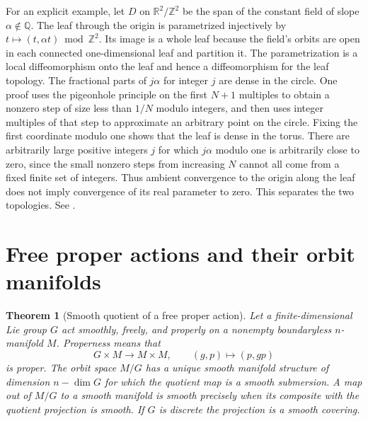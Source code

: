 \documentclass[11pt,oneside,openany]{book}
\newtheorem{theorem}{Theorem}[chapter]
\theoremstyle{definition}
\theoremstyle{remark}
\newcommand{\R}{\mathbb R}
\begin{document}
For an explicit example, let \(D\) on \(\R^2/\mathbb Z^2\) be the span of the constant field of slope \(\alpha\notin\mathbb Q\). The leaf through the origin is parametrized injectively by \(t\mapsto(t,\alpha t)\bmod\mathbb Z^2\). Its image is a whole leaf because the field's orbits are open in each connected one-dimensional leaf and partition it. The parametrization is a local diffeomorphism onto the leaf and hence a diffeomorphism for the leaf topology. The fractional parts of \(j\alpha\) for integer \(j\) are dense in the circle. One proof uses the pigeonhole principle on the first \(N+1\) multiples to obtain a nonzero step of size less than \(1/N\) modulo integers, and then uses integer multiples of that step to approximate an arbitrary point on the circle. Fixing the first coordinate modulo one shows that the leaf is dense in the torus. There are arbitrarily large positive integers \(j\) for which \(j\alpha\) modulo one is arbitrarily close to zero, since the small nonzero steps from increasing \(N\) cannot all come from a fixed finite set of integers. Thus ambient convergence to the origin along the leaf does not imply convergence of its real parameter to zero. This separates the two topologies. See \cite[pp.~501--505, especially Theorem 19.21]{lee}.

\section{Free proper actions and their orbit manifolds}

\begin{theorem}[Smooth quotient of a free proper action]
\label{p104:M08.04}
Let a finite-dimensional Lie group \(G\) act smoothly, freely, and properly on a nonempty boundaryless \(n\)-manifold \(M\). Properness means that
\[
 G\times M\longrightarrow M\times M,\qquad (g,p)\longmapsto (p,gp)
\]
is proper. The orbit space \(M/G\) has a unique smooth manifold structure of dimension \(n-\dim G\) for which the quotient map is a smooth submersion. A map out of \(M/G\) to a smooth manifold is smooth precisely when its composite with the quotient projection is smooth. If \(G\) is discrete the projection is a smooth covering.
\end{theorem}
\end{document}
